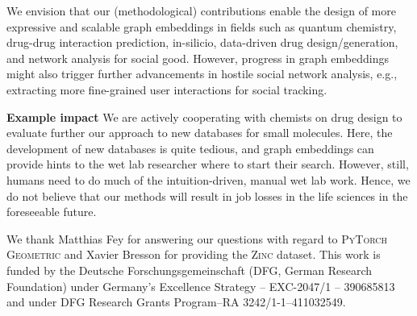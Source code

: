 \documentclass{article}
\newcommand{\xhdr}[1]{{\noindent\bfseries #1}}
\theoremstyle{definition}
\begin{document}
We envision that our (methodological) contributions enable the design of more expressive and scalable graph embeddings in fields such as quantum chemistry, drug-drug interaction prediction, in-silicio, data-driven drug design/generation, and network analysis for social good. However, progress in graph embeddings might also trigger further advancements in hostile social network analysis, e.g., extracting more fine-grained user interactions for social tracking.

\xhdr{Example impact} We are actively cooperating with chemists on drug design to evaluate further our approach to new databases for small molecules. Here, the development of new databases is quite tedious, and graph embeddings can provide hints to the wet lab researcher where to start their search. However, still, humans need to do much of the intuition-driven, manual wet lab work.  Hence, we do not believe that our methods will result in job losses in the life sciences in the foreseeable future.

\begin{ack}
We thank Matthias Fey for answering our questions with regard to \textsc{PyTorch Geometric} and Xavier Bresson for providing the \textsc{Zinc} dataset.
This work is funded by the Deutsche Forschungsgemeinschaft (DFG, German Research Foundation) under Germany's Excellence Strategy -- EXC-2047/1 -- 390685813
and under DFG Research Grants Program--RA 3242/1-1--411032549. 
\end{ack}
\end{document}
